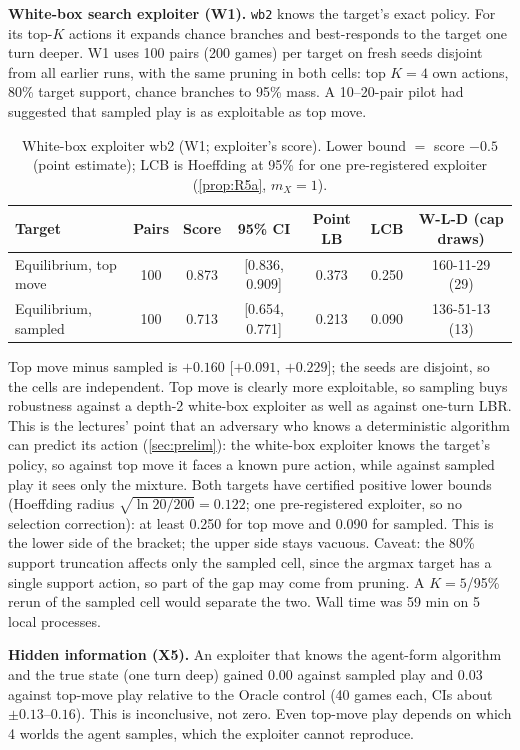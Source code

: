 \documentclass[10pt]{article}
\theoremstyle{plain}
\theoremstyle{definition}
\theoremstyle{remark}
\begin{document}
\textbf{White-box search exploiter (W1).} \texttt{wb2} knows the target's exact policy. For its top-$K$ actions it expands chance branches and best-responds to the target one turn deeper. W1 uses 100 pairs (200 games) per target on fresh seeds disjoint from all earlier runs, with the same pruning in both cells: top $K{=}4$ own actions, 80\% target support, chance branches to 95\% mass. A 10--20-pair pilot had suggested that sampled play is as exploitable as top move.
\begin{table}[h]
\centering\small
\caption{White-box exploiter wb2 (W1; exploiter's score). Lower bound $=$ score $-0.5$ (point estimate); LCB is Hoeffding at 95\% for one pre-registered exploiter (\cref{prop:R5a}, $m_X{=}1$).}
\label{tab:wb}
\begin{tabular}{@{}lcccccc@{}}
\toprule
Target & Pairs & Score & 95\% CI & Point LB & LCB & W-L-D (cap draws) \\
\midrule
Equilibrium, top move & 100 & 0.873 & [0.836, 0.909] & 0.373 & 0.250 & 160-11-29 (29) \\
Equilibrium, sampled & 100 & 0.713 & [0.654, 0.771] & 0.213 & 0.090 & 136-51-13 (13) \\
\bottomrule
\end{tabular}
\vspace{-0.6em}
\end{table}
Top move minus sampled is $+0.160$ [$+0.091$, $+0.229$]; the seeds are disjoint, so the cells are independent. Top move is clearly more exploitable, so sampling buys robustness against a depth-2 white-box exploiter as well as against one-turn LBR. This is the lectures' point that an adversary who knows a deterministic algorithm can predict its action (\cref{sec:prelim}): the white-box exploiter knows the target's policy, so against top move it faces a known pure action, while against sampled play it sees only the mixture. Both targets have certified positive lower bounds (Hoeffding radius $\sqrt{\ln 20/200}=0.122$; one pre-registered exploiter, so no selection correction): at least 0.250 for top move and 0.090 for sampled. This is the lower side of the bracket; the upper side stays vacuous. Caveat: the 80\% support truncation affects only the sampled cell, since the argmax target has a single support action, so part of the gap may come from pruning. A $K{=}5$/95\% rerun of the sampled cell would separate the two. Wall time was 59 min on 5 local processes.

\textbf{Hidden information (X5).} An exploiter that knows the agent-form algorithm and the true state (one turn deep) gained 0.00 against sampled play and 0.03 against top-move play relative to the Oracle control (40 games each, CIs about $\pm0.13$--$0.16$). This is inconclusive, not zero. Even top-move play depends on which 4 worlds the agent samples, which the exploiter cannot reproduce.
\end{document}
